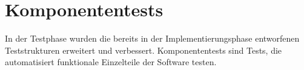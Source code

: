 \section{Komponententests}
In der Testphase wurden die bereits in der Implementierungsphase entworfenen Teststrukturen erweitert und verbessert.
Komponententests sind Tests, die automatisiert funktionale Einzelteile der Software testen.


